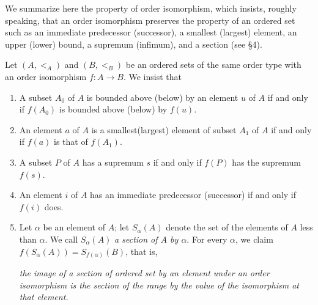 \documentclass[a4paper,12pt]{article}
\begin{document}
We summarize here the property of order isomorphism,
which insists, roughly speaking, that
an order isomorphism preserves the property of an ordered set
such as
an immediate predecessor (successor),
a smallest (largest) element,
an upper (lower) bound,
a supremum (infimum),
and a section (see \S4).
\begin{prp}\label{prop:order_type}
	\leavevmode \par \noindent
	Let
	\( (A,<_{A})\)
	and
	\( (B,<_{B}) \)
	be an ordered sets of the same order type with an order isomorphism
	\( f:A \to B \).
	We insist that
	\begin{enumerate}
		\item \label{enu:isom_bounded}
		      A subset \( A_0 \) of \( A \) is bounded above (below) by an element \( u \) of \( A \)
		      if and only if \( f(A_0) \) is bounded above (below) by \( f(u) \).
		      
		\item \label{enu:ismo_smallest}
		      An element \( a \) of \( A \) is a smallest(largest) element of subset \( A_1 \) of \( A \)
		      if and only if \( f(a) \) is that of \( f(A_1)\).
		      
		\item \label{enu:isom_supremum}
		      A subset \( P \) of \( A \) has a supremum \( s \)
		      if and only if \( f(P) \) has the supremum \( f(s) \).
		      
		\item \label{enu:isom_immediate}
		      An element \( i \) of \( A \) has an immediate predecessor (successor)
		      if and only if \( f(i) \) does.
		      
		\item \label{enu:isom_section}
		      Let \(\alpha\) be an element of \( A \); let \( S_{\alpha}(A) \) denote the set of the elements of \( A \) less than \(\alpha\).
		      We call \( S_{\alpha}(A) \) \textit{a section of \( A \) by \(\alpha\)}.
		      For every \( \alpha \), we claim \( f(S_{\alpha}(A))= S_{f(\alpha)}(B) \),
		      that is,\leavevmode \par \noindent
		      \textit{the image of a section of ordered set by an element under an order isomorphism
			      is the section of the range by the value of the isomorphism at that element.}
	\end{enumerate}
\end{prp}
\end{document}
